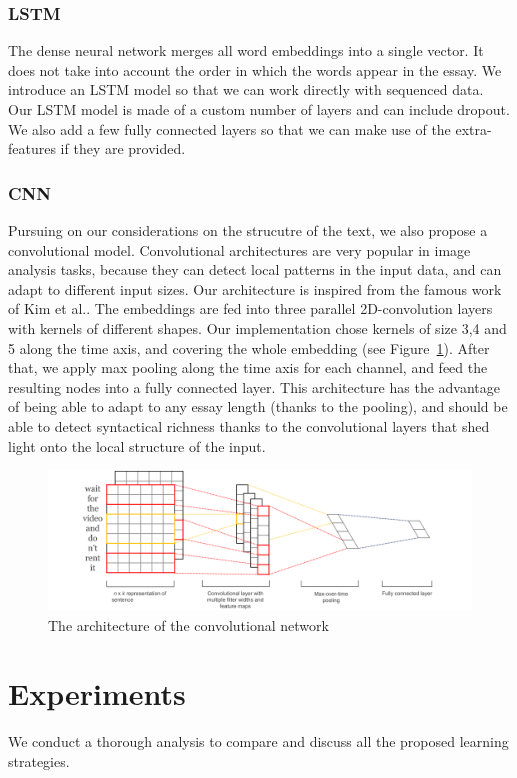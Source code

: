 \documentclass[a4paper,12pt,english]{article}
\begin{document}
\subsubsection{LSTM}
The dense neural network merges all word embeddings into a single vector.
It does not take into account the order in which the words appear in the essay.
We introduce an LSTM model so that we can work directly with sequenced data.
Our LSTM model is made of a custom number of layers and can include dropout.
We also add a few fully connected layers so that we can make use of the extra-features if they are provided.
\subsubsection{CNN}
Pursuing on our considerations on the strucutre of the text, we also propose a convolutional model. Convolutional architectures are very popular in image analysis tasks, because they can detect local patterns in the input data, and can adapt to different input sizes. Our architecture is inspired from the famous work of Kim et al.\cite{kim2014convolutional}. The embeddings are fed into three parallel 2D-convolution layers with kernels of different shapes. Our implementation chose kernels of size 3,4 and 5 along the time axis, and covering the whole embedding (see Figure~\ref{kim2014figure}). After that, we apply max pooling along the time axis for each channel, and feed the resulting nodes into a fully connected layer. This architecture has the advantage of being able to adapt to any essay length (thanks to the pooling), and should be able to detect syntactical richness thanks to the convolutional layers that shed light onto the local structure of the input.
\begin{figure}
	\centering
	\includegraphics[width=\textwidth]{fig/kim2014fig.png}
	\caption{The architecture of the convolutional network\cite{kim2014convolutional}}
	\label{kim2014figure}
\end{figure}

\section{Experiments}
We conduct a thorough analysis to compare and discuss all the proposed learning strategies.
\end{document}

